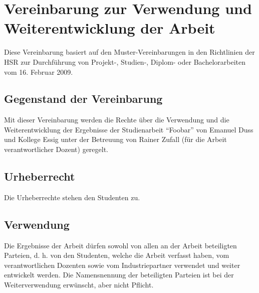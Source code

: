 \chapter{Vereinbarung zur Verwendung und Weiterentwicklung der Arbeit}

Diese Vereinbarung basiert auf den Muster-Vereinbarungen in den Richtlinien der
HSR zur Durchführung von Projekt-, Studien-, Diplom- oder Bachelorarbeiten vom
16. Februar 2009.

\section{Gegenstand der Vereinbarung}

Mit dieser Vereinbarung werden die Rechte über die Verwendung und die
Weiterentwicklung der Ergebnisse der Studienarbeit "`Foobar"' von Emanuel Duss
und Kollege Essig unter der Betreuung von Rainer Zufall (für die Arbeit
verantwortlicher Dozent) geregelt.

\section{Urheberrecht}

Die Urheberrechte stehen den Studenten zu.

\section{Verwendung}

Die Ergebnisse der Arbeit dürfen sowohl von allen an der Arbeit beteiligten
Parteien, d. h. von den Studenten, welche die Arbeit verfasst haben, vom
verantwortlichen Dozenten sowie vom Industriepartner verwendet und weiter
entwickelt werden. Die Namensnennung der beteiligten Parteien ist bei der
Weiterverwendung erwünscht, aber nicht Pflicht.

